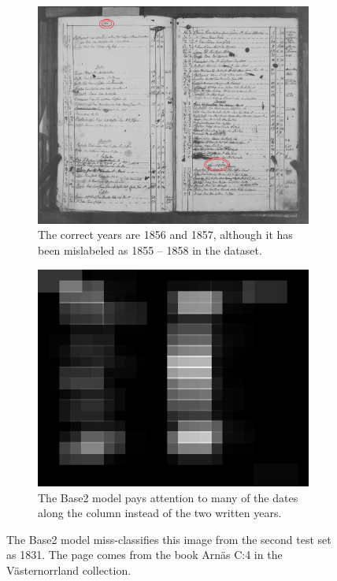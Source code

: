
\begin{figure}
    \centering
    \begin{subfigure}[c]{1.0\textwidth}
        \centering    \includegraphics[scale=0.56]{resources/SWE_attention/33SQ-GRNM-9CM6.jpg}
        \caption{The correct years are 1856 and 1857, although it has been mislabeled as 1855 -- 1858 in the dataset.}
    \end{subfigure}

    \vspace{1em}

    \begin{subfigure}[t]{1.0\textwidth}
        \centering
        \includegraphics[scale=1.0]{resources/SWE_attention/Base2/att_33SQ-GRNM-9CM6.jpg}
        \caption{The Base2 model pays attention to many of the dates along the column instead of the two written years.}
    \end{subfigure}

    \caption{The Base2 model miss-classifies this image from the second test set as 1831. The page comes from the book Arnäs C:4 in the Västernorrland collection.}
    \label{fig:attention_dep_9CM6}
\end{figure}
